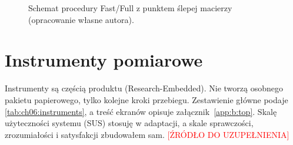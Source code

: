 \begin{figure}[htbp]
  \centering
  \caption{Schemat procedury Fast/Full z punktem ślepej macierzy (opracowanie własne autora).
  }
  \label{fig:ch06:procedure}
\end{figure}

\section{Instrumenty pomiarowe}
\label{ch06:sec:instrumenty}

Instrumenty są częścią produktu (Research-Embedded). Nie tworzą osobnego pakietu papierowego, tylko kolejne kroki przebiegu. Zestawienie główne podaje \cref{tab:ch06:instruments}, a treść ekranów opisuje załącznik~\ref{app:b:top}.
Skalę użyteczności systemu (SUS) stosuję w adaptacji, a skale sprawczości, zrozumiałości i satysfakcji zbudowałem sam. \textcolor{red}{[ŹRÓDŁO DO UZUPEŁNIENIA]}

